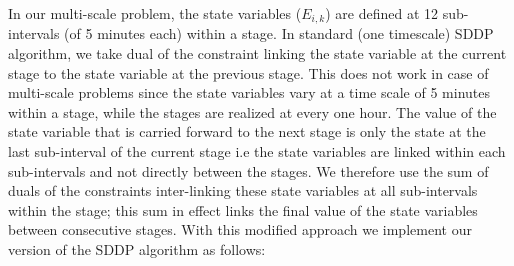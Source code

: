 \documentclass[11pt,twoside]{article}
\begin{document}
In our multi-scale problem, the state variables ($E_{i,k}$) are defined at 12 sub-intervals (of 5 minutes each) within a stage.  In standard (one timescale) SDDP algorithm, we take dual of the constraint linking the state variable at the current stage to the state variable at the previous stage. This does not work in case of multi-scale problems since the state variables vary at a time scale of 5 minutes within a stage, while the stages are realized at every one hour. The value of the state variable that is carried forward to the next stage is only the state at the last sub-interval of the current stage i.e the state variables are linked within each sub-intervals and not directly between the stages. We therefore use the sum of duals of the constraints inter-linking these state variables at all sub-intervals within the stage; this sum in effect links the final value of the state variables between consecutive stages. With this modified approach we implement our version of the SDDP algorithm as follows:    
\end{document}
